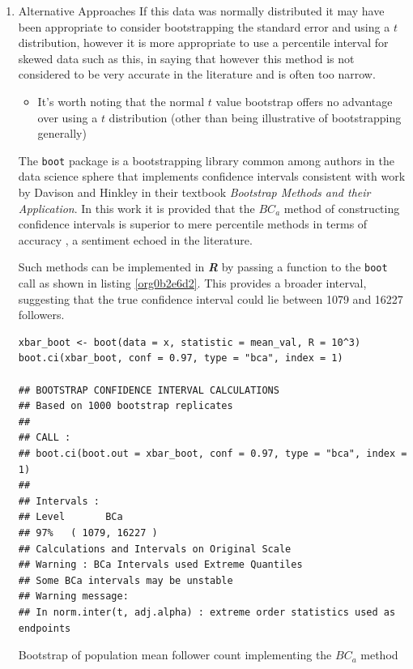 \documentclass[11pt]{article}
\begin{document}
\begin{enumerate}
\item Alternative Approaches
\label{sec:org71ff356}
If this data was normally distributed it may have been appropriate to consider
bootstrapping the standard error and using a \(t\) distribution, however it is more appropriate to use a
percentile interval for skewed data such as this, in saying that however this method is not considered to be very accurate in the literature and is often too narrow. \cite[Section 4.1]{hesterberg2015}

\begin{itemize}
\item It's worth noting that the normal \(t\) value bootstrap offers no advantage over
using a \(t\) distribution (other than being illustrative of bootstrapping
generally) \cite[Section 4.1]{hesterberg2015}
\end{itemize}


 The \texttt{boot} package is a bootstrapping library common among authors in the data science sphere
 \cite[p. 295]{james2013} \cite[p. 237]{wiley2019} that implements
 confidence intervals consistent with work by Davison and Hinkley
 \cite{ripley2020} in their textbook \emph{Bootstrap Methods and their Application}.
In this work it is provided that the \(BC_{a}\) method of constructing confidence
 intervals is  superior to mere percentile
 methods in terms of accuracy \cite[Ch. 5]{davison1997}, a sentiment echoed in the literature. \cite[Ch. 5]{carpenter2000,davison1997}

Such methods can be implemented in \textbf{\emph{R}} by passing a function to the \texttt{boot} call as shown in listing \ref{org0b2e6d2}. This provides a broader interval, suggesting that the true confidence interval could lie between 1079 and 16227 followers.

\begin{listing}[htbp]
\begin{verbatim}
xbar_boot <- boot(data = x, statistic = mean_val, R = 10^3)
boot.ci(xbar_boot, conf = 0.97, type = "bca", index = 1)

## BOOTSTRAP CONFIDENCE INTERVAL CALCULATIONS
## Based on 1000 bootstrap replicates
##
## CALL :
## boot.ci(boot.out = xbar_boot, conf = 0.97, type = "bca", index = 1)
##
## Intervals :
## Level       BCa
## 97%   ( 1079, 16227 )
## Calculations and Intervals on Original Scale
## Warning : BCa Intervals used Extreme Quantiles
## Some BCa intervals may be unstable
## Warning message:
## In norm.inter(t, adj.alpha) : extreme order statistics used as endpoints
\end{verbatim}
\caption{\label{org0b2e6d2}Bootstrap of population mean follower count implementing the \(BC_{a}\) method}
\end{listing}
\end{enumerate}
\end{document}
